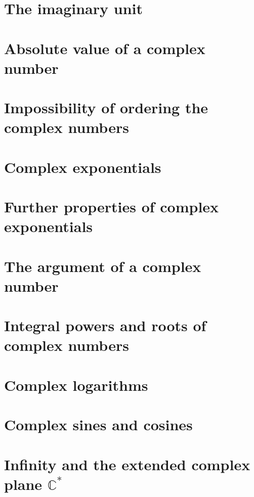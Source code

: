 \documentclass[class=mike-apostol-mathematical-analysis,crop=false]{standalone}
\begin{document}
\section{The imaginary unit}

\section{Absolute value of a complex number}

\section{Impossibility of ordering the complex numbers}

\section{Complex exponentials}

\section{Further properties of complex exponentials}

\section{The argument of a complex number}

\section{Integral powers and roots of complex numbers}

\section{Complex logarithms}

\section{Complex sines and cosines}

\section{Infinity and the extended complex plane $\mathbb{C}^{*}$}
\end{document}
